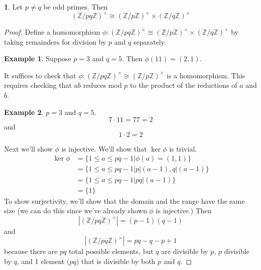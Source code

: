 \documentclass[12pt]{article}
\theoremstyle{definition}
\newtheorem{theorem}{\color{ForestGreen}{\textbf{Theorem}}}
\newtheorem{example}{\color{WildStrawberry}Example}
\theoremstyle{definition}
\begin{document}
\begin{theorem}
	Let $p \neq q$ be odd primes. Then
	\begin{equation}
		(\mathbb{Z}/pq \mathbb{Z})^{\times} \cong (\mathbb{Z}/p \mathbb{Z})^{\times} \times (\mathbb{Z}/q \mathbb{Z})^{\times}
	\end{equation}
\end{theorem}
\begin{proof}
	Define a homomorphism $\phi: (\mathbb{Z}/pq \mathbb{Z})^{\times} \cong (\mathbb{Z}/p \mathbb{Z})^{\times} \times (\mathbb{Z}/q \mathbb{Z})^{\times}$ by taking remainders for division by $p$ and $q$ separately. 
	\begin{example}
	Suppose $p=3$ and $q=5$. Then $\phi(11) = (2, 1)$.
	\end{example}
	It suffices to check that $\phi: (\mathbb{Z}/pq \mathbb{Z})^{\times} \cong (\mathbb{Z}/p \mathbb{Z})^{\times}$ is a homomorphism. This requires checking that $ab$ reduces mod $p$ to the product of the reductions of $a$ and $b$. 
	\begin{example}$p = 3$ and $q = 5$.
	\begin{equation}
	7 \cdot 11 = 77 = 2
	\end{equation}
	and 
	\begin{equation}
	1 \cdot 2 = 2
	\end{equation}
	\end{example}
	Next we'll show $\phi$ is injective. We'll show that $\ker \phi$ is trivial.
	\begin{align*}
		\ker \phi &= \{1 \leq a \leq pq - 1 | \phi(a) = (1,1)\} \\
		&= \{1 \leq a \leq pq - 1 \Big\vert p | (a-1), q | (a-1) \} \\ 
		&= \{1 \leq a \leq pq - 1 \Big\vert pq | (a-1) \} \\
		&= \{1\}
	\end{align*}
	To show surjectivity, we'll show that the domain and the range have the same size (we can do this since we've already shown $\phi$ is injective.) Then
	\begin{equation}
		|(\mathbb{Z}/pq \mathbb{Z})^{\times}| = (p-1)(q-1) 
	\end{equation}
	and
	\begin{equation}
		|(\mathbb{Z}/pq \mathbb{Z})^{\times}| = pq - q - p + 1
	\end{equation}
	because there are $pq$ total possible elements, but $q$ are divisible by $p$, $p$ divisible by $q$, and 1 element ($pq$) that is divisible by both $p$ and $q$. 
\end{proof}
\end{document}
